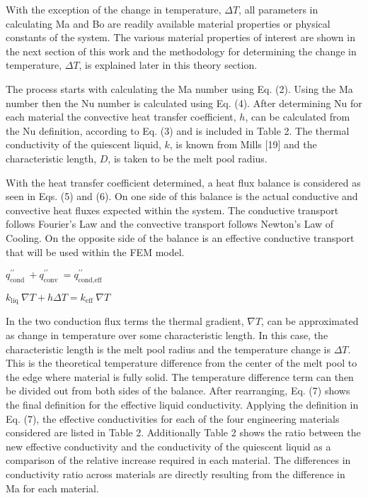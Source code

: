 \documentclass[10pt]{article}
\begin{document}
With the exception of the change in temperature, $\Delta T$, all parameters in calculating Ma and Bo are readily available material properties or physical constants of the system. The various material properties of interest are shown in the next section of this work and the methodology for determining the change in temperature, $\Delta T$, is explained later in this theory section.

The process starts with calculating the Ma number using Eq. (2). Using the Ma number then the Nu number is calculated using Eq. (4). After determining Nu for each material the convective heat transfer coefficient, $h$, can be calculated from the Nu definition, according to Eq. (3) and is included in Table 2. The thermal conductivity of the quiescent liquid, $k$, is known from Mills [19] and the characteristic length, $D$, is taken to be the melt pool radius.

With the heat transfer coefficient determined, a heat flux balance is considered as seen in Eqs. (5) and (6). On one side of this balance is the actual conductive and convective heat fluxes expected within the system. The conductive transport follows Fourier's Law and the convective transport follows Newton's Law of Cooling. On the opposite side of the balance is an effective conductive transport that will be used within the FEM model.

$q_{\text {cond }}^{\prime \prime}+q_{\text {conv }}^{\prime \prime}=q_{\text {cond,eff }}^{\prime \prime}$

$k_{\text {liq }} \nabla T+h \Delta T=k_{\text {eff }} \nabla T$

In the two conduction flux terms the thermal gradient, $\nabla T$, can be approximated as change in temperature over some characteristic length. In this case, the characteristic length is the melt pool radius and the temperature change is $\Delta T$. This is the theoretical temperature difference from the center of the melt pool to the edge where material is fully solid. The temperature difference term can then be divided out from both sides of the balance. After rearranging, Eq. (7) shows the final definition for the effective liquid conductivity. Applying the definition in Eq. (7), the effective conductivities for each of the four engineering materials considered are listed in Table 2. Additionally Table 2 shows the ratio between the new effective conductivity and the conductivity of the quiescent liquid as a comparison of the relative increase required in each material. The differences in conductivity ratio across materials are directly resulting from the difference in Ma for each material.
\end{document}
